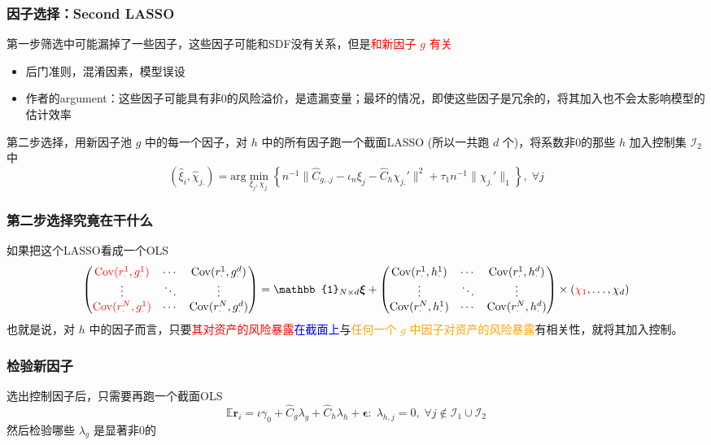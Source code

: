 \documentclass[
  UTF8,
  xcolor={dvipsnames,rgb},
  hyperref={colorlinks, citecolor=orange, linkcolor=black},
  aspectratio=169
  ]{beamer}
\begin{document}
\begin{frame}
    \frametitle{因子选择：Second LASSO}
    第一步筛选中可能漏掉了一些因子，这些因子可能和SDF没有关系，但是\textcolor{red}{和新因子 \(g\) 有关}
    \begin{itemize}
        \item 后门准则，混淆因素，模型误设
        \item 作者的argument：这些因子可能具有非0的风险溢价，是遗漏变量；最坏的情况，即使这些因子是冗余的，将其加入也不会太影响模型的估计效率
    \end{itemize}
    第二步选择，用新因子池 \(g\) 中的每一个因子，对 \(h\) 中的所有因子跑一个截面LASSO (所以一共跑 \(d\) 个)，将系数非0的那些 \(h\) 加入控制集 \(\mathcal{I}_2\) 中
    \[(\hat{\xi}_{i},\hat{\chi}_{j.}) = \textrm{arg} \min_{\xi_{j},\chi_{j.}} \left\{ n^{-1}\lVert \hat{C}_{g,.j}-\iota_{n}\xi_{j}-\hat{C}_{h}\chi_{j.}' \rVert^{2} + \tau_{1}n^{-1}\lVert \chi_{j.}' \rVert_{1}  \right\} , \; \forall j\]
\end{frame}

\begin{frame}
    \frametitle{第二步选择究竟在干什么}
    如果把这个LASSO看成一个OLS
    {\small
        \[
        \begin{pmatrix}
            \textcolor{red}{\mathrm{Cov}(r_{\cdot}^{1},g_{\cdot}^{1})} & \cdots & \mathrm{Cov}(r_{\cdot}^{1},g_{\cdot}^{d}) \\
            \vdots & \ddots & \vdots \\
            \textcolor{red}{\mathrm{Cov}(r_{\cdot}^{N},g_{\cdot}^{1})} & \cdots & \mathrm{Cov}(r_{\cdot}^{N},g_{\cdot}^{d})
            \end{pmatrix}=\mathbb{1}_{N\times d} \boldsymbol{\xi} + \begin{pmatrix}
            \mathrm{Cov}(r_{\cdot}^{1},h_{\cdot}^{1}) & \cdots & \mathrm{Cov}(r_{\cdot}^{1},h_{\cdot}^{d}) \\
            \vdots & \ddots & \vdots \\
            \mathrm{Cov}(r_{\cdot}^{N},h_{\cdot}^{1}) & \cdots & \mathrm{Cov}(r_{\cdot}^{N},h_{\cdot}^{d})
            \end{pmatrix}\times (\textcolor{red}{\chi_{1}},\dots,\chi_{d})
        \]
    }
    也就是说，对 \(h\) 中的因子而言，只要\textcolor{red}{其对资产的风险暴露}\textcolor{blue}{在截面上}与\textcolor{orange}{任何一个 \(g\) 中因子对资产的风险暴露}有相关性，就将其加入控制。
\end{frame}

\begin{frame}
    \frametitle{检验新因子}

    选出控制因子后，只需要再跑一个截面OLS
    \[
        \mathbb{E}\boldsymbol{r}_{i}=\iota \gamma_{0}+\hat{C}_{g}\lambda_{g}+\hat{C}_{h}\lambda_{h}+\boldsymbol{\epsilon}: \; \lambda_{h,j}=0, \; \forall j \notin \mathcal{I}_1 \cup \mathcal{I}_2
    \]
    然后检验哪些 \(\lambda_g\) 是显著非0的

\end{frame}
\end{document}
